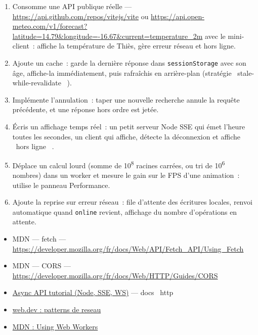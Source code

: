 \documentclass[12pt,a4paper,twoside,openright]{book}
\newcommand{\link}[2]{\href{#2}{#1}}
\DeclareRobustCommand{\clic}[1]{\textcolor{linkblue}{\textsf{#1}}}
\begin{document}
\begin{exercice}
\begin{enumerate}
  \item Consomme une API publique r\'eelle --- \url{https://api.github.com/repos/vitejs/vite} ou
        \url{https://api.open-meteo.com/v1/forecast?latitude=14.79&longitude=-16.67&current=temperature_2m}
        avec le mini-client~: affiche la temp\'erature de Thi\`es, g\`ere erreur r\'eseau et hors ligne.
  \item Ajoute un cache~: garde la derni\`ere r\'eponse dans \verb|sessionStorage| avec son \^age,
        affiche-la imm\'ediatement, puis rafra\^ichis en arri\`ere-plan (strat\'egie
        \og ~stale-while-revalidate~ \fg{}).
  \item Impl\'emente l'annulation~: taper une nouvelle recherche annule la requ\^ete pr\'ec\'edente,
        et une r\'eponse hors ordre est jet\'ee.
  \item \'Ecris un affichage temps r\'eel~: un petit serveur Node SSE qui \'emet l'heure toutes les
        secondes, un client qui affiche, d\'etecte la d\'econnexion et affiche \og ~hors ligne~ \fg{}.
  \item D\'eplace un calcul lourd (somme de 10\textsuperscript{8} racines carr\'ees, ou tri de
        10\textsuperscript{6} nombres) dans un worker et mesure le gain sur le FPS d'une
        animation~: utilise le panneau \clic{Performance}.
  \item Ajoute la reprise sur erreur r\'eseau~: file d'attente des \'ecritures locales, renvoi
        automatique quand \verb|online| revient, affichage du nombre d'op\'erations en attente.
\end{enumerate}
\end{exercice}

\begin{ressources}
\begin{itemize}
  \item MDN --- fetch --- \url{https://developer.mozilla.org/fr/docs/Web/API/Fetch_API/Using_Fetch}
  \item MDN --- CORS --- \url{https://developer.mozilla.org/fr/docs/Web/HTTP/Guides/CORS}
  \item \link{Async API tutorial (Node, SSE, WS)}{https://github.com/nodejs/node} --- docs \og ~http~ \fg{}
  \item \link{web.dev : patterns de reseau}{https://web.dev/patterns/}
  \item \link{MDN : Using Web Workers}{https://developer.mozilla.org/fr/docs/Web/API/Web\_Workers\_API/Using\_web\_workers}
\end{itemize}
\end{ressources}
\end{document}
